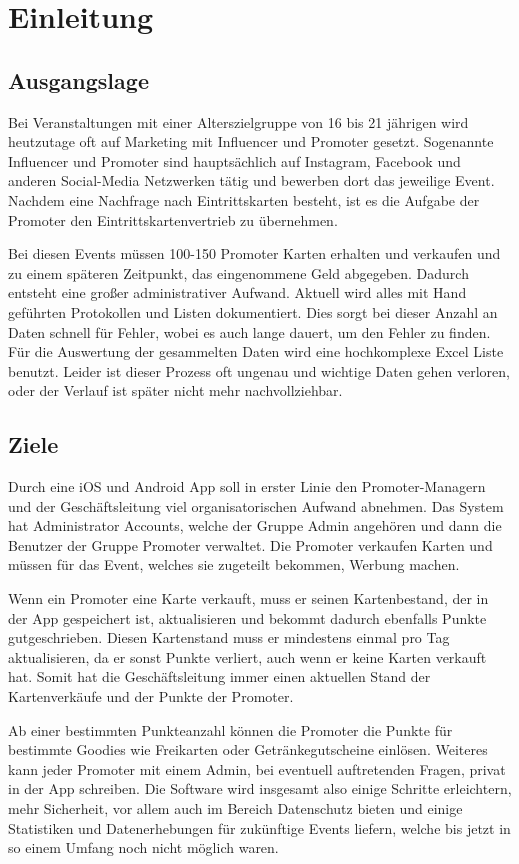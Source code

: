 \chapter{Einleitung}
\section{Ausgangslage}
Bei Veranstaltungen mit einer Alterszielgruppe von 16 bis 21 jährigen wird heutzutage oft auf Marketing mit Influencer und Promoter gesetzt. 
Sogenannte Influencer und Promoter sind hauptsächlich auf Instagram, Facebook und anderen Social-Media Netzwerken tätig und bewerben dort das jeweilige Event. 
Nachdem eine Nachfrage nach Eintrittskarten besteht, ist es die Aufgabe der Promoter den Eintrittskartenvertrieb zu übernehmen. 

Bei diesen Events müssen 100-150 Promoter Karten erhalten und verkaufen und zu einem späteren Zeitpunkt, das eingenommene Geld abgegeben. Dadurch entsteht eine großer 
administrativer Aufwand. Aktuell wird alles mit Hand geführten Protokollen und Listen dokumentiert.
Dies sorgt bei dieser Anzahl an Daten schnell für Fehler, wobei es auch lange dauert, um den Fehler zu finden.
Für die Auswertung der gesammelten Daten wird eine hochkomplexe Excel Liste benutzt. Leider ist dieser Prozess oft ungenau und wichtige 
Daten gehen verloren, oder der Verlauf ist später nicht mehr nachvollziehbar. 

\section{Ziele}
Durch eine iOS und Android App soll in erster Linie den Promoter-Managern und der Geschäftsleitung viel organisatorischen Aufwand abnehmen. 
Das System hat Administrator Accounts,  welche der Gruppe Admin angehören und dann die Benutzer der Gruppe Promoter verwaltet.
Die Promoter verkaufen Karten und müssen für das Event, welches sie zugeteilt bekommen, Werbung machen.

Wenn ein Promoter eine Karte verkauft, muss er seinen Kartenbestand, der in der App gespeichert ist, aktualisieren und bekommt dadurch ebenfalls Punkte gutgeschrieben.
Diesen Kartenstand muss er mindestens einmal pro Tag aktualisieren, da er sonst Punkte verliert, auch wenn er keine Karten verkauft hat.
Somit hat die Geschäftsleitung immer einen aktuellen Stand der Kartenverkäufe und der Punkte der Promoter.

Ab einer bestimmten Punkteanzahl können die Promoter die Punkte für bestimmte Goodies wie Freikarten oder Getränkegutscheine einlösen.
Weiteres kann jeder Promoter mit einem Admin, bei eventuell auftretenden Fragen, privat in der App schreiben.
Die Software wird insgesamt also einige Schritte erleichtern, mehr Sicherheit, vor allem auch im Bereich Datenschutz bieten und einige Statistiken und Datenerhebungen für zukünftige Events liefern,
welche bis jetzt in so einem Umfang noch nicht möglich waren.

